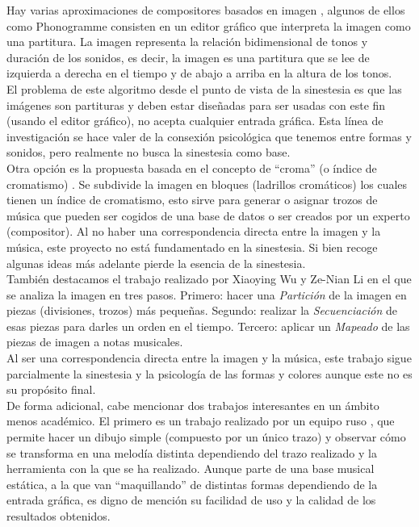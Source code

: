 Hay varias aproximaciones de compositores basados en imagen , algunos de ellos como Phonogramme \cite{ImageBaseComposition} \cite{Phonogramme} consisten en un editor gráfico que interpreta la imagen como una partitura. La imagen representa la relación bidimensional de tonos y duración de los sonidos, es decir, la imagen es una partitura que se lee de izquierda a derecha en el tiempo y de abajo a arriba en la altura de los tonos. 
\\El problema de este algoritmo desde el punto de vista de la sinestesia es que las imágenes son partituras y deben estar diseñadas para ser usadas con este fin (usando el editor gráfico), no acepta cualquier entrada gráfica. Esta línea de investigación se hace valer de la consexión psicológica que tenemos entre formas y sonidos, pero realmente no busca la sinestesia como base.\\

Otra opción es la propuesta basada en el concepto de ``croma'' (o índice de cromatismo) \cite{bricksConvertsMusic}. Se subdivide la imagen en bloques (ladrillos cromáticos) los cuales tienen un índice de cromatismo, esto sirve para generar o asignar trozos de música que pueden ser cogidos de una base de datos o ser creados por un experto (compositor). Al no haber una correspondencia directa entre la imagen y la música, este proyecto no está fundamentado en la sinestesia. Si bien recoge algunas ideas más adelante pierde la esencia de la sinestesia.\\

También destacamos el trabajo realizado por Xiaoying Wu y Ze-Nian Li \cite{ImageBaseComposition} en el que se analiza la imagen en tres pasos. Primero: hacer una \emph{Partición} de la imagen en piezas (divisiones, trozos) más pequeñas. Segundo: realizar la \emph{Secuenciación} de esas piezas para darles un orden en el tiempo. Tercero: aplicar un \emph{Mapeado} de las piezas de imagen a notas musicales.
\\Al ser una correspondencia directa entre la imagen y la música, este trabajo sigue parcialmente la sinestesia y la psicología de las formas y colores aunque este no es su propósito final.\\ 

De forma adicional, cabe mencionar dos trabajos interesantes en un ámbito menos académico.
El primero es un trabajo realizado por un equipo ruso \cite{dibujosymusica}, que permite hacer un dibujo simple (compuesto por un único trazo) y observar cómo se transforma en una melodía distinta dependiendo del trazo realizado y la herramienta con la que se ha realizado. Aunque parte de una base musical estática, a la que van ``maquillando'' de distintas formas dependiendo de la entrada gráfica, es digno de mención su facilidad de uso y la calidad de los resultados obtenidos.\\

